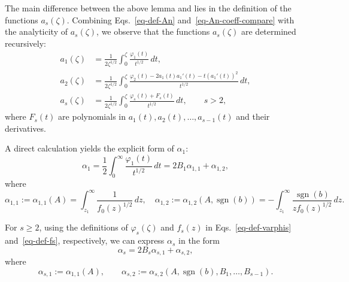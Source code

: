 \documentclass[12pt]{article}
\theoremstyle{plain}
\theoremstyle{definition}
\newtheorem{remark}{\hskip\parindent Remark}
\numberwithin{equation}{section}
\newcommand\sgn{\operatorname{sgn}}
\begin{document}
\begin{remark}\label{rem-b=0-1}
The main difference between the above lemma and \cite[Lemma 1]{Long-Jiang-Li} lies in the definition of the functions $a_{s}(\zeta)$. Combining Eqs.~\eqref{eq-def-An} and~\eqref{eq-An-coeff-compare} with the analyticity of $a_{s}(\zeta)$, we observe that the functions $a_{s}(\zeta)$ are determined recursively:
\begin{equation}\label{eq-explicit-representation-a-s}
\begin{split}
a_{1}(\zeta) &= \frac{1}{2\zeta^{1/2}} \int_{0}^{\zeta} \frac{\varphi_{1}(t)}{t^{1/2}} \, dt, \\
a_{2}(\zeta) &= \frac{1}{2\zeta^{1/2}} \int_{0}^{\zeta} \frac{\varphi_{2}(t) - 2a_{1}(t)a_{1}'(t) - t(a_{1}'(t))^2}{t^{1/2}} \, dt, \\
a_{s}(\zeta) &= \frac{1}{2\zeta^{1/2}} \int_{0}^{\zeta} \frac{\varphi_{s}(t) + F_{s}(t)}{t^{1/2}} \, dt, \qquad s > 2,
\end{split}
\end{equation}
where $F_{s}(t)$ are polynomials in $a_{1}(t), a_{2}(t), \ldots, a_{s-1}(t)$ and their derivatives.

A direct calculation yields the explicit form of $\alpha_1$:
\begin{equation}
\label{eq-explicit-represent-a1pha1}
\alpha_{1} = \frac{1}{2} \int_{0}^{\infty} \frac{\varphi_{1}(t)}{t^{1/2}} \, dt = 2B_{1} \alpha_{1,1} + \alpha_{1,2},
\end{equation}
where
\begin{equation}\label{eq-def-alpha11-alpha12}
\alpha_{1,1} := \alpha_{1,1}(A) = \int_{z_{1}}^{\infty} \frac{1}{f_{0}(z)^{1/2}} \, dz, \quad
\alpha_{1,2} := \alpha_{1,2}(A, \sgn(b)) = -\int_{z_{1}}^{\infty} \frac{\sgn(b)}{z f_{0}(z)^{1/2}} \, dz.
\end{equation}

For $s \geq 2$, using the definitions of $\varphi_{s}(\zeta)$ and $f_{s}(z)$ in Eqs.~\eqref{eq-def-varphis} and~\eqref{eq-def-fs}, respectively, we can express $\alpha_{s}$ in the form
\begin{equation}\label{eq-facterization-alphas}
\alpha_{s} = 2B_{s} \alpha_{s,1} + \alpha_{s,2},
\end{equation}
where
\begin{equation}\label{eq-def-alphas1-alphas2}
\alpha_{s,1} := \alpha_{1,1}(A), \qquad
\alpha_{s,2} := \alpha_{s,2}(A, \sgn(b), B_{1}, \ldots, B_{s-1}).
\end{equation}
\end{remark}
\end{document}
